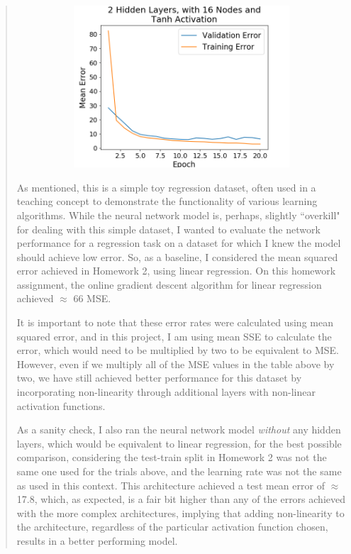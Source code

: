 \documentclass{article}
\begin{document}
\begin{quote}
\begin{figure}[h!]
\begin{subfigure}[h]{0.23\textwidth}
		\includegraphics[width=\textwidth]{figs/Boston_Housing_Regression_2_Hidden_Layers_with_16_Nodes_and_Tanh_Activation.png}
	\end{subfigure}
\end{figure}


	 As mentioned, this is a simple toy regression dataset, often used in a teaching concept to demonstrate the functionality of various learning algorithms. While the neural network model is, perhaps, slightly ``overkill" for dealing with this simple dataset, I wanted to evaluate the network performance for a regression task on a dataset for which I knew the model should achieve low error. So, as a baseline, I considered the mean squared error achieved in Homework 2, using linear regression. On this homework assignment, the online gradient descent algorithm for linear regression achieved $\approx$ 66 MSE. 
	 
	 It is important to note that these error rates were calculated using mean squared error, and in this project, I am using mean SSE to calculate the error, which would need to be multiplied by two to be equivalent to MSE. However, even if we multiply all of the MSE values in the table above by two, we have still achieved better performance for this dataset by incorporating non-linearity through additional layers with non-linear activation functions. 
	 
	 As a sanity check, I also ran the neural network model \textit{without} any hidden layers, which would be equivalent to linear regression, for the best possible comparison, considering the test-train split in Homework 2 was not the same one used for the trials above, and the learning rate was not the same as used in this context. This architecture achieved a test mean error of $\approx$ 17.8, which, as expected, is a fair bit higher than any of the errors achieved with the more complex architectures, implying that adding non-linearity to the architecture, regardless of the particular activation function chosen, results in a better performing model.
	 

\end{quote}
\end{document}
